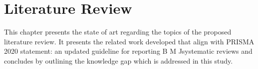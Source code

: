 
\chapter{Literature Review}	%
\label{Chapter2}	%
This chapter presents the state of art regarding the topics of the proposed literature review. It presents
the related work developed that align with PRISMA 2020 statement: an updated guideline for reporting
B M Jsystematic reviews and concludes by outlining the knowledge gap which is addressed in this study.


